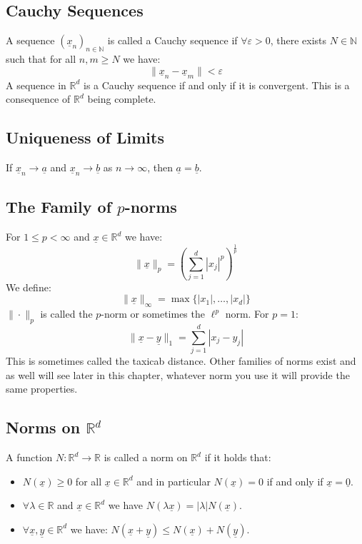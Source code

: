 \documentclass[12pt]{article}
\newcommand{\seq}[2]{(#1_#2)_{#2\in\mathbb{N}}}
\begin{document}
\subsection{Cauchy Sequences}
A sequence \(\seq{\underline{x}}{n}\) is called a Cauchy sequence if \(\forall \varepsilon>0\), there exists \(N\in\mathbb{N}\) such that for all \(n,m\geq N\) we have:
\[\|\underline{x}_n-\underline{x}_m\|<\varepsilon\]
A sequence in \(\mathbb{R}^d\) is a Cauchy sequence if and only if it is convergent. This is a consequence of \(\mathbb{R}^d\) being complete.
\subsection{Uniqueness of Limits}
If \(\underline{x}_n\to \underline{a}\) and \(\underline{x}_n\to\underline{b}\) as \(n\to\infty\), then \(\underline{a}=\underline{b}\).
\subsection{The Family of \(p\)-norms}
For \(1\leq p<\infty\) and \(\underline{x}\in\mathbb{R}^d\) we have:
\[\|\underline{x}\|_p=\left(\sum^d_{j=1}|x_j|^p\right)^{\frac{1}{p}}\]
We define:
\[\|\underline{x}\|_\infty=\max\{|x_1|,\dots,|x_d|\}\]
\(\|\cdot\|_p\) is called the \(p\)-norm or sometimes the \(\ell^p\) norm. For \(p=1\):
\[\|\underline{x}-\underline{y}\|_1=\sum^d_{j=1}|x_j-y_j|\]
This is sometimes called the taxicab distance. Other families of norms exist and as well will see later in this chapter, whatever norm you use it will provide the same properties.
\subsection{Norms on \(\mathbb{R}^d\)}
A function \(N:\mathbb{R}^d\to\mathbb{R}\) is called a norm on \(\mathbb{R}^d\) if it holds that:
\begin{itemize}
    \item \(N(\underline{x})\geq 0\) for all \(\underline{x}\in\mathbb{R}^d\) and in particular \(N(\underline{x})=0\) if and only if \(\underline{x}=\underline{0}\).
    \item \(\forall\lambda\in\mathbb{R}\) and \(\underline{x}\in\mathbb{R}^d\) we have \(N(\lambda \underline{x})=|\lambda|N(\underline{x})\).
    \item \(\forall \underline{x}, \underline{y}\in\mathbb{R}^d\) we have: \(N(\underline{x}+\underline{y})\leq N(\underline{x})+N(\underline{y})\).
\end{itemize}
\end{document}
